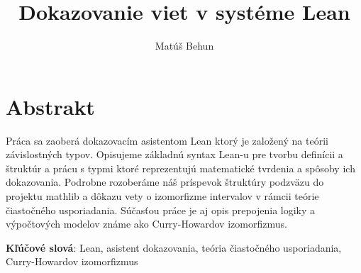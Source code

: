\documentclass[a4paper,10pt,oneside]{report}%
\author{Mat\'u\v{s} Behun}
\title{Dokazovanie viet v systéme Lean}
\begin{document}






\section{Abstrakt}

    Práca sa zaoberá dokazovacím asistentom Lean ktorý je založený na teórii
závislostných typov.
    Opisujeme základnú syntax Lean-u pre tvorbu definícii a štruktúr a prácu s typmi
ktoré reprezentujú matematické tvrdenia a spôsoby ich dokazovania.
    Podrobne rozoberáme náš príspevok štruktúry podzväzu do projektu mathlib a
dôkazu vety o izomorfizme intervalov v rámcii teórie čiastočného usporiadania.
    Súčasťou práce je aj opis prepojenia logiky a výpočtových modelov známe ako
Curry-Howardov izomorfizmus.

    \textbf{Kľúčové slová}: Lean, asistent dokazovania, teória čiastočného usporiadania, Curry-Howardov izomorfizmus

~\\
\end{document}
